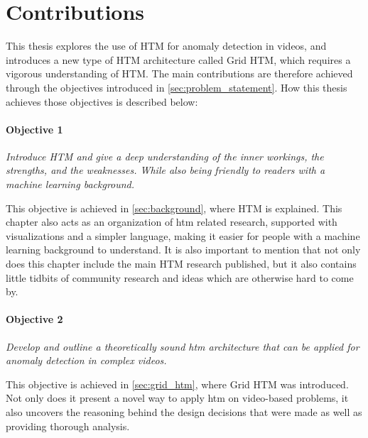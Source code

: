 \section{Contributions}
This thesis explores the use of HTM for anomaly detection in videos, and introduces a new type of HTM architecture called Grid HTM, which requires a vigorous understanding of HTM. The main contributions are therefore achieved through the objectives introduced in \autoref{sec:problem_statement}. How this thesis achieves those objectives is described below:
\paragraph*{Objective 1} \emph{Introduce HTM and give a deep understanding of the inner workings, the strengths, and the weaknesses. While also being friendly to readers with a machine learning background.}
\par
This objective is achieved in \autoref{sec:background}, where HTM is explained. This chapter also acts as an organization of  \gls*{htm} related research, supported with visualizations and a simpler language, making it easier for people with a machine learning background to understand. It is also important to mention that not only does this chapter include the main HTM research published, but it also contains little tidbits of community research and ideas which are otherwise hard to come by.
\paragraph*{Objective 2} \emph{Develop and outline a theoretically sound \gls*{htm} architecture that can be applied for anomaly detection in complex videos.}
\par
This objective is achieved in \autoref{sec:grid_htm}, where Grid HTM was introduced. Not only does it present a novel way to apply  \gls*{htm} on video-based problems, it also uncovers the reasoning behind the design decisions that were made as well as providing thorough analysis.
